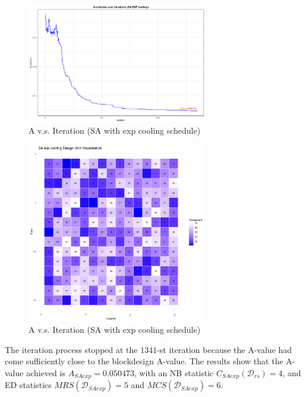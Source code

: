 \documentclass[
  a4paper,
  oneside,
  openany,
  12pt,
  onecolumn]{book}
\theoremstyle{definition}
\theoremstyle{plain}
\theoremstyle{remark}
\begin{document}
\begin{figure}[H]

{\centering \includegraphics[width=0.7\textwidth,height=\textheight]{images/Rplots/SA_F example.png}

}

\caption{A v.s. Iteration (SA with exp cooling schedule)}

\end{figure}%
\begin{figure}[H]

{\centering \includegraphics[width=0.7\textwidth,height=\textheight]{images/Rplots/SA_F visualization.png}

}

\caption{A v.s. Iteration (SA with exp cooling schedule)}

\end{figure}%

The iteration process stopped at the \(1341\)-st iteration because the
A-value had come sufficiently close to the blockdesign A-value. The
results show that the A-value achieved is \(A_{SAexp} = 0.050473\), with
an NB statistic \(C_{SAexp}(\mathcal{D}_{rs})=4\), and ED statistics
\(MRS(\mathcal{D}_{SAexp})=5\) and \(MCS(\mathcal{D}_{SAexp})=6\).
\end{document}
